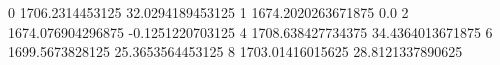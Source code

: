 0 1706.2314453125 32.0294189453125
1 1674.2020263671875 0.0
2 1674.076904296875 -0.1251220703125
4 1708.638427734375 34.4364013671875
6 1699.5673828125 25.3653564453125
8 1703.01416015625 28.8121337890625
